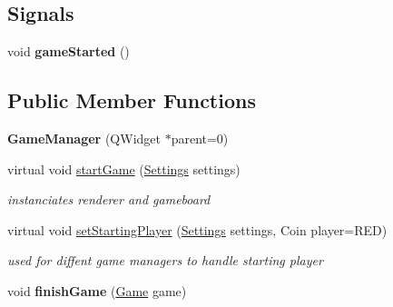 \subsection*{Signals}
\begin{DoxyCompactItemize}
\item 
\hypertarget{class_game_manager_ae63cd6e5b6b2458d5260d421433aa43c}{void {\bfseries game\-Started} ()}\label{class_game_manager_ae63cd6e5b6b2458d5260d421433aa43c}

\end{DoxyCompactItemize}
\subsection*{Public Member Functions}
\begin{DoxyCompactItemize}
\item 
\hypertarget{class_game_manager_a22f8d699d465b1246ed1ca95cb5e8126}{{\bfseries Game\-Manager} (Q\-Widget $\ast$parent=0)}\label{class_game_manager_a22f8d699d465b1246ed1ca95cb5e8126}

\item 
\hypertarget{class_game_manager_a4acbc34fa6c280d0f6d48ff867626ce2}{virtual void \hyperlink{class_game_manager_a4acbc34fa6c280d0f6d48ff867626ce2}{start\-Game} (\hyperlink{struct_settings}{Settings} settings)}\label{class_game_manager_a4acbc34fa6c280d0f6d48ff867626ce2}

\begin{DoxyCompactList}\small\item\em instanciates renderer and gameboard \end{DoxyCompactList}\item 
\hypertarget{class_game_manager_a6ec9d87c1a6366be0f5b2191b798a679}{virtual void \hyperlink{class_game_manager_a6ec9d87c1a6366be0f5b2191b798a679}{set\-Starting\-Player} (\hyperlink{struct_settings}{Settings} settings, Coin player=R\-E\-D)}\label{class_game_manager_a6ec9d87c1a6366be0f5b2191b798a679}

\begin{DoxyCompactList}\small\item\em used for diffent game managers to handle starting player \end{DoxyCompactList}\item 
\hypertarget{class_game_manager_afc363c6765b4fdf990f75bd5978a9dbb}{void {\bfseries finish\-Game} (\hyperlink{struct_game}{Game} game)}\label{class_game_manager_afc363c6765b4fdf990f75bd5978a9dbb}

\end{DoxyCompactItemize}
